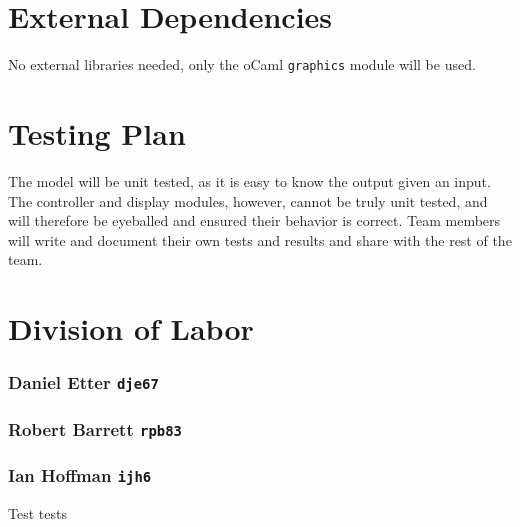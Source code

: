 \documentclass[10pt]{article}
\begin{document}
\clearpage
\part*{External Dependencies}
No external libraries needed, only the oCaml \texttt{graphics} module will be used.

\part*{Testing Plan}
The model will be unit tested, as it is easy to know the output given an input. The controller and display modules, however, cannot be truly unit tested, and will therefore be eyeballed and ensured their behavior is correct. Team members will write and document their own tests and results and share with the rest of the team.

\part*{Division of Labor}
\section*{Daniel Etter \texttt{dje67}}
\section*{Robert Barrett \texttt{rpb83}}
\section*{Ian Hoffman \texttt{ijh6}}
Test tests
\end{document}
